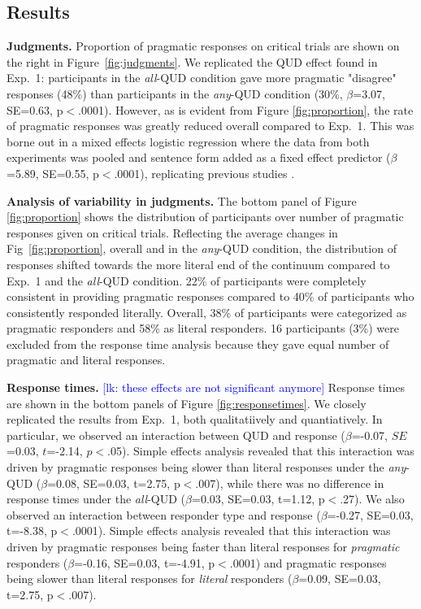 \documentclass[10pt,letterpaper]{article}
\newcommand{\lk}[1]{\textcolor{Blue}{[lk: #1]}}
\newcommand{\figref}[1]{Figure \ref{#1}}
\begin{document}
\subsection{Results}

\noindent \textbf{Judgments.} Proportion of pragmatic responses on critical trials are shown on the right in Figure~\ref{fig:judgments}. We replicated the QUD effect found in Exp.~1: participants in the \textit{all}-QUD condition gave more pragmatic "disagree" responses (48\%) than participants in the \textit{any}-QUD condition (30\%, $\beta$=3.07, SE=0.63, p$<$.0001). However, as is evident from \figref{fig:proportion}, the rate of pragmatic responses was greatly reduced overall compared to Exp.~1. This was borne out in a mixed effects logistic regression where the data from both experiments was  pooled and sentence form added as a fixed effect predictor ($\beta$=5.89, SE=0.55, p$<$.0001), replicating previous studies \cite{DegenTanenhaus2015,Degen2015}. 


\noindent \textbf{Analysis of variability in judgments.} The bottom panel of \figref{fig:proportion} shows the distribution of participants over number of pragmatic responses given on critical trials. Reflecting the average changes in  Fig~\ref{fig:proportion}, overall and in the \emph{any}-QUD condition, the distribution of  responses shifted towards the more literal end of the continuum compared to Exp.~1 and the \emph{all}-QUD condition.  22\% of participants were completely consistent in providing pragmatic responses compared to 40\% of participants who consistently responded literally. Overall, 38\% of participants were categorized as pragmatic responders and 58\% as literal responders. 16 participants (3\%) were excluded from the response time analysis because they gave equal number of pragmatic and literal responses.

\noindent \textbf{Response times.} \lk{these effects are not significant anymore} Response times are shown in the bottom panels of \figref{fig:responsetimes}. We closely replicated the results from Exp.~1, both qualitatiively and quantiatively. In particular, we observed an interaction between QUD and response ($\beta$=-0.07, $SE$=0.03, $t$=-2.14, $p$$<$.05). Simple effects analysis revealed that this interaction was driven by pragmatic responses being slower than literal responses under the \textit{any}-QUD ($\beta$=0.08, SE=0.03, t=2.75, p$<$.007), while there was no difference in response times under the \textit{all}-QUD ($\beta$=0.03, SE=0.03, t=1.12, p$<$.27). We also observed an interaction between responder type and response ($\beta$=-0.27, SE=0.03, t=-8.38, p$<$.0001). Simple effects analysis revealed that this interaction was driven by pragmatic responses being faster than literal responses for \emph{pragmatic}  responders ($\beta$=-0.16, SE=0.03, t=-4.91, p$<$.0001) and pragmatic responses being slower than literal responses for \emph{literal} responders ($\beta$=0.09, SE=0.03, t=2.75, p$<$.007). 
\end{document}

